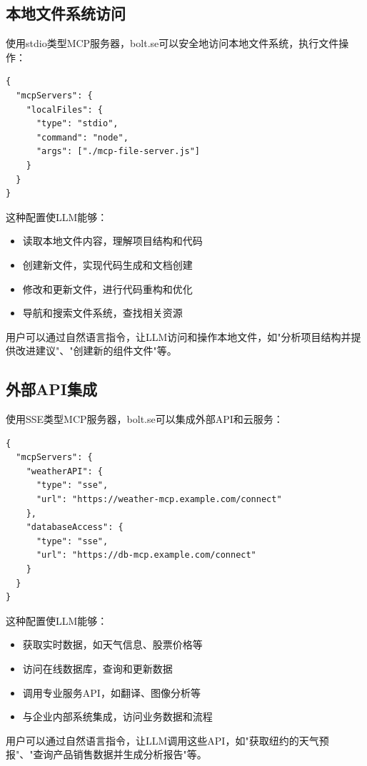 \subsection{本地文件系统访问}

使用stdio类型MCP服务器，bolt.se可以安全地访问本地文件系统，执行文件操作：

\begin{verbatim}
{
  "mcpServers": {
    "localFiles": {
      "type": "stdio",
      "command": "node",
      "args": ["./mcp-file-server.js"]
    }
  }
}
\end{verbatim}

这种配置使LLM能够：
\begin{itemize}
  \item 读取本地文件内容，理解项目结构和代码
  \item 创建新文件，实现代码生成和文档创建
  \item 修改和更新文件，进行代码重构和优化
  \item 导航和搜索文件系统，查找相关资源
\end{itemize}

用户可以通过自然语言指令，让LLM访问和操作本地文件，如"分析项目结构并提供改进建议"、"创建新的组件文件"等。

\subsection{外部API集成}

使用SSE类型MCP服务器，bolt.se可以集成外部API和云服务：

\begin{verbatim}
{
  "mcpServers": {
    "weatherAPI": {
      "type": "sse",
      "url": "https://weather-mcp.example.com/connect"
    },
    "databaseAccess": {
      "type": "sse",
      "url": "https://db-mcp.example.com/connect"
    }
  }
}
\end{verbatim}

这种配置使LLM能够：
\begin{itemize}
  \item 获取实时数据，如天气信息、股票价格等
  \item 访问在线数据库，查询和更新数据
  \item 调用专业服务API，如翻译、图像分析等
  \item 与企业内部系统集成，访问业务数据和流程
\end{itemize}

用户可以通过自然语言指令，让LLM调用这些API，如"获取纽约的天气预报"、"查询产品销售数据并生成分析报告"等。

